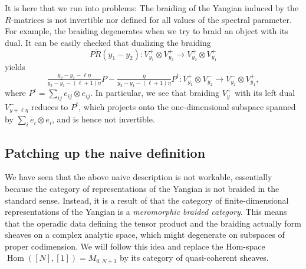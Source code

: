 \documentclass[11pt]{report}
\theoremstyle{definition}
\theoremstyle{remark}
\theoremstyle{remark}
\newcommand{\Hom}{\operatorname{Hom}}
\begin{document}
It is here that we run into problems: The braiding of the Yangian induced by the $R$-matrices is not invertible nor defined for all values of the spectral parameter. For example, the braiding degenerates when we try to braid an object with its dual. It can be easily checked that dualizing the braiding
\begin{equation*}
P \check R(y_1-y_2): V_{y_1}^+ \otimes V_{y_2}^+ \to V_{y_2}^+ \otimes V_{y_1}^+
\end{equation*}
yields
\begin{equation*}
\tfrac{y_2-y_1-\ell\eta}{y_2-y_1-(\ell+1)\eta} P - \tfrac{\eta}{y_2-y_1-(\ell+1)\eta} P^t: V_{y_1}^+ \otimes V_{y_2}^- \to V_{y_2}^- \otimes V_{y_1}^+,
\end{equation*}
where $P^t = \sum_{ij} e_{ij} \otimes e_{ij}$. In particular, we see that braiding $V_y^+$ with its left dual $V_{y+\ell\eta}^-$ reduces to $P^t$, which projects onto the one-dimensional subspace spanned by $\sum_i e_i \otimes e_i$, and is hence not invertible.

\subsection{Patching up the naive definition}

We have seen that the above naive description is not workable, essentially because the category of representations of the Yangian is not braided in the standard sense. Instead, it is a result of \cite{article:soibelman:1997} that the category of finite-dimensional representations of the Yangian is a \emph{meromorphic braided category}. This means that the operadic data defining the tensor product and the braiding actually form sheaves on a complex analytic space, which might degenerate on subspaces of proper codimension. We will follow this idea and replace the Hom-space $\Hom([N],[1]) = \overline{M}_{0,N+1}$ by its category of quasi-coherent sheaves.
\end{document}
